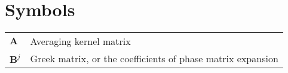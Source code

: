 \chapter{Symbols}

\begingroup
\onehalfspacing
\begin{center}
\begin{small}
\begin{longtable}{R{4em} p{31em} }
  $\mathbf{A}$     & Averaging kernel matrix \\
  $\mathbf{B}^j$   & Greek matrix, or the coefficients of phase matrix
expansion \\
\end{longtable}
\end{small}
\end{center}
\endgroup
